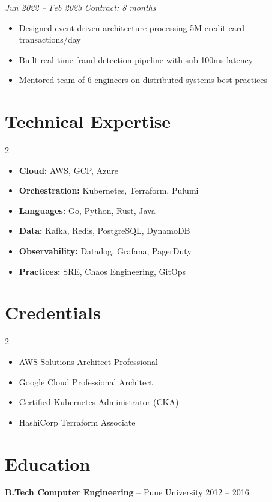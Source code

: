 \documentclass[10pt,letterpaper]{article}
\begin{document}
\vspace{4pt}
\begin{tcolorbox}[title={\textbf{CRED} -- Backend Systems Architect},colbacktitle=teal,coltitle=white]
\textit{Jun 2022 -- Feb 2023} \hfill \textit{Contract: 8 months}
\begin{itemize}
\item Designed event-driven architecture processing 5M credit card transactions/day
\item Built real-time fraud detection pipeline with sub-100ms latency
\item Mentored team of 6 engineers on distributed systems best practices
\end{itemize}
\end{tcolorbox}

\section{Technical Expertise}
\begin{multicols}{2}
\begin{itemize}
\item \textbf{Cloud:} AWS, GCP, Azure
\item \textbf{Orchestration:} Kubernetes, Terraform, Pulumi
\item \textbf{Languages:} Go, Python, Rust, Java
\item \textbf{Data:} Kafka, Redis, PostgreSQL, DynamoDB
\item \textbf{Observability:} Datadog, Grafana, PagerDuty
\item \textbf{Practices:} SRE, Chaos Engineering, GitOps
\end{itemize}
\end{multicols}

\section{Credentials}
\begin{multicols}{2}
\begin{itemize}
\item AWS Solutions Architect Professional
\item Google Cloud Professional Architect
\item Certified Kubernetes Administrator (CKA)
\item HashiCorp Terraform Associate
\end{itemize}
\end{multicols}

\section{Education}
\textbf{B.Tech Computer Engineering} -- Pune University \hfill 2012 -- 2016
\end{document}
